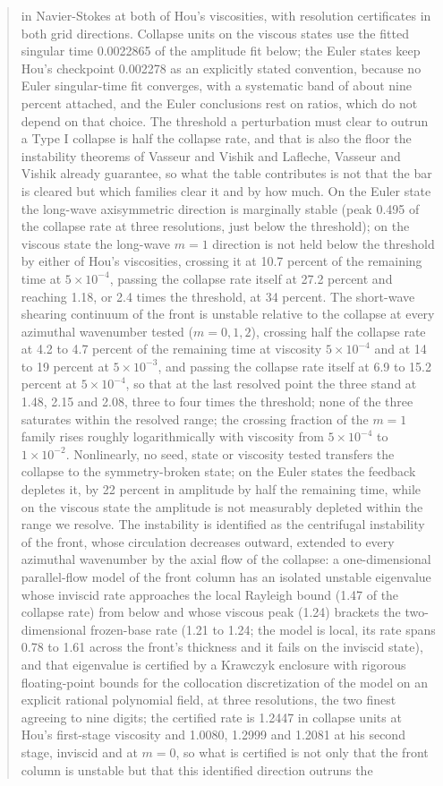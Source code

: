 \documentclass[11pt]{article}
\newcommand{\sn}[2]{#1\times 10^{#2}}
\begin{document}
\begin{abstract}
in Navier-Stokes at both of Hou's viscosities, with resolution certificates in both grid directions. Collapse units on the viscous states use the fitted singular time 0.0022865 of the amplitude fit below; the Euler states keep Hou's checkpoint 0.002278 as an explicitly stated convention, because no Euler singular-time fit converges, with a systematic band of about nine percent attached, and the Euler conclusions rest on ratios, which do not depend on that choice. The threshold a perturbation must clear to outrun a Type I collapse is half the collapse rate, and that is also the floor the instability theorems of Vasseur and Vishik \cite{VV20} and Lafleche, Vasseur and Vishik \cite{LVV21} already guarantee, so what the table contributes is not that the bar is cleared but which families clear it and by how much. On the Euler state the long-wave axisymmetric direction is marginally stable (peak 0.495 of the collapse rate at three resolutions, just below the threshold); on the viscous state the long-wave $m = 1$ direction is not held below the threshold by either of Hou's viscosities, crossing it at 10.7 percent of the remaining time at $\sn{5}{-4}$, passing the collapse rate itself at 27.2 percent and reaching 1.18, or 2.4 times the threshold, at 34 percent. The short-wave shearing continuum of the front is unstable relative to the collapse at every azimuthal wavenumber tested ($m = 0, 1, 2$), crossing half the collapse rate at 4.2 to 4.7 percent of the remaining time at viscosity $\sn{5}{-4}$ and at 14 to 19 percent at $\sn{5}{-3}$, and passing the collapse rate itself at 6.9 to 15.2 percent at $\sn{5}{-4}$, so that at the last resolved point the three stand at 1.48, 2.15 and 2.08, three to four times the threshold; none of the three saturates within the resolved range; the crossing fraction of the $m = 1$ family rises roughly logarithmically with viscosity from $\sn{5}{-4}$ to $\sn{1}{-2}$. Nonlinearly, no seed, state or viscosity tested transfers the collapse to the symmetry-broken state; on the Euler states the feedback depletes it, by 22 percent in amplitude by half the remaining time, while on the viscous state the amplitude is not measurably depleted within the range we resolve. The instability is identified as the centrifugal instability of the front, whose circulation decreases outward, extended to every azimuthal wavenumber by the axial flow of the collapse: a one-dimensional parallel-flow model of the front column has an isolated unstable eigenvalue whose inviscid rate approaches the local Rayleigh bound (1.47 of the collapse rate) from below and whose viscous peak (1.24) brackets the two-dimensional frozen-base rate (1.21 to 1.24; the model is local, its rate spans 0.78 to 1.61 across the front's thickness and it fails on the inviscid state), and that eigenvalue is certified by a Krawczyk enclosure with rigorous floating-point bounds for the collocation discretization of the model on an explicit rational polynomial field, at three resolutions, the two finest agreeing to nine digits; the certified rate is 1.2447 in collapse units at Hou's first-stage viscosity and 1.0080, 1.2999 and 1.2081 at his second stage, inviscid and at $m = 0$, so what is certified is not only that the front column is unstable but that this identified direction outruns the 
\end{abstract}
\end{document}

